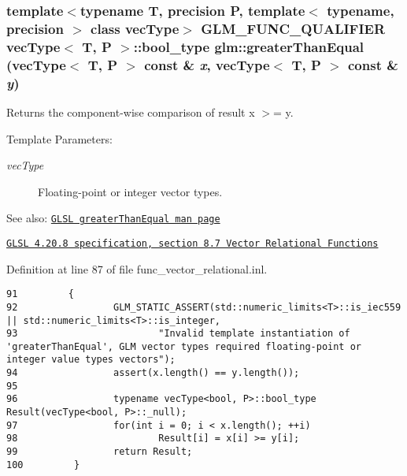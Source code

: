 \hypertarget{group__core__func__vector__relational_ga384b9c124d40d56bf5bd02ea9b04926}{
\subsubsection[greaterThanEqual]{\setlength{\rightskip}{0pt plus 5cm}template$<$typename T, precision P, template$<$ typename, precision $>$ class vecType$>$ GLM\_\-FUNC\_\-QUALIFIER vecType$<$ T, P $>$::bool\_\-type glm::greaterThanEqual (vecType$<$ T, P $>$ const \& {\em x}, \/  vecType$<$ T, P $>$ const \& {\em y})}}
\label{group__core__func__vector__relational_ga384b9c124d40d56bf5bd02ea9b04926}


Returns the component-wise comparison of result x $>$= y.

\begin{Desc}
\item[Template Parameters:]
\begin{description}
\item[{\em vecType}]Floating-point or integer vector types.\end{description}
\end{Desc}
\begin{Desc}
\item[See also:]\href{http://www.opengl.org/sdk/docs/manglsl/xhtml/greaterThanEqual.xml}{\tt GLSL greaterThanEqual man page} 

\href{http://www.opengl.org/registry/doc/GLSLangSpec.4.20.8.pdf}{\tt GLSL 4.20.8 specification, section 8.7 Vector Relational Functions} \end{Desc}


Definition at line 87 of file func\_\-vector\_\-relational.inl.

\begin{Code}\begin{verbatim}91         {
92                 GLM_STATIC_ASSERT(std::numeric_limits<T>::is_iec559 || std::numeric_limits<T>::is_integer,
93                         "Invalid template instantiation of 'greaterThanEqual', GLM vector types required floating-point or integer value types vectors");
94                 assert(x.length() == y.length());
95 
96                 typename vecType<bool, P>::bool_type Result(vecType<bool, P>::_null);
97                 for(int i = 0; i < x.length(); ++i)
98                         Result[i] = x[i] >= y[i];
99                 return Result;
100         }
\end{verbatim}
\end{Code}


